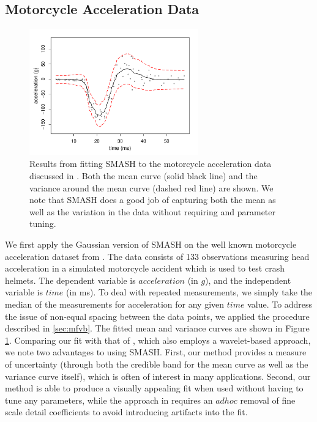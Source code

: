 \documentclass[12pt]{article}
\begin{document}
\subsection{Motorcycle Acceleration Data}
\begin{figure}
\centering
    \includegraphics[width=0.65\textwidth]{motorcycle.pdf}
    \caption{Results from fitting SMASH to the motorcycle acceleration data discussed in \cite{silverman1985some}. Both the mean curve (solid black line) and the variance around the mean curve (dashed red line) are shown. We note that SMASH does a good job of capturing both the mean as well as the variation in the data without requiring and parameter tuning.}
    \label{fig:motorcycle}
\end{figure}

We first apply the Gaussian version of SMASH on the well known motorcycle acceleration dataset from \cite{silverman1985some}. The data consists of 133 observations measuring head acceleration in a simulated motorcycle accident which is used to test crash helmets. The dependent variable is $acceleration$ (in $g$), and the independent variable is $time$ (in ms). To deal with repeated measurements, we simply take the median of the measurements for acceleration for any given $time$ value. To address the issue of non-equal spacing between the data points, we applied the procedure described in \ref{sec:mfvb}. The fitted mean and variance curves are shown in Figure \ref{fig:motorcycle}. Comparing our fit with that of \cite{Delouille2004Smooth}, which also employs a wavelet-based approach, we note two advantages to using SMASH. First, our method provides a measure of uncertainty (through both the credible band for the mean curve as well as the variance curve itself), which is often of interest in many applications. Second, our method is able to produce a visually appealing fit when used without having to tune any parameters, while the approach in \cite{Delouille2004Smooth} requires an $adhoc$ removal of fine scale detail coefficients to avoid introducing artifacts into the fit.
\end{document}
